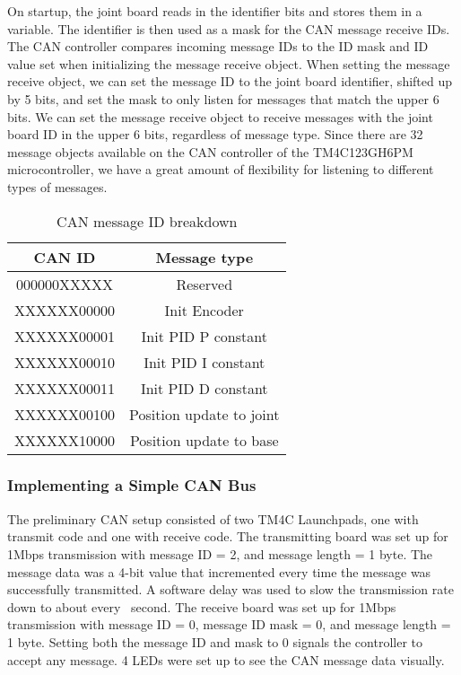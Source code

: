 \noindent On startup, the joint board reads in the identifier bits and stores them in a variable. The identifier is then used as a mask for the CAN message receive IDs. The CAN controller compares incoming message IDs to the ID mask and ID value set when initializing the message receive object. When setting the message receive object, we can set the message ID to the joint board identifier, shifted up by 5 bits, and set the mask to only listen for messages that match the upper 6 bits. We can set the message receive object to receive messages with the joint board ID in the upper 6 bits, regardless of message type. Since there are 32 message objects available on the CAN controller of the TM4C123GH6PM microcontroller, we have a great amount of flexibility for listening to different types of messages.

\begin{table}
	\centering
	\caption{CAN message ID breakdown}
	\begin{tabular}{| c | c |}
		\hline
		CAN ID & Message type \\
		\hline
		\textsc{000000XXXXX} & Reserved \\
		\textsc{XXXXXX00000} & Init Encoder \\
		\textsc{XXXXXX00001} & Init PID P constant \\
		\textsc{XXXXXX00010} & Init PID I constant \\
		\textsc{XXXXXX00011} & Init PID D constant \\
		\textsc{XXXXXX00100} & Position update to joint \\
		\textsc{XXXXXX10000} & Position update to base\\
		\hline
	\end{tabular}
\end{table}

\subsubsection{Implementing a Simple CAN Bus}
The preliminary CAN setup consisted of two TM4C Launchpads, one with transmit code and one with receive code. The transmitting board was set up for 1Mbps transmission with message ID = 2, and message length = 1 byte. The message data was a 4-bit value that incremented every time the message was successfully transmitted. A software delay was used to slow the transmission rate down to about every ~second. The receive board was set up for 1Mbps transmission with message ID = 0, message ID mask = 0, and message length = 1 byte. Setting both the message ID and mask to 0 signals the controller to accept any message. 4 LEDs were set up to see the CAN message data visually.

